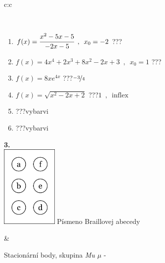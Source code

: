 \documentclass[10pt]{report}
\begin{document}
\begin{tabular}{c:c}
\begin{minipage}[c][104.5mm][t]{0.5\linewidth}
\begin{center}
\begin{minipage}{0.95\linewidth}
\begin{center}
\end{center}
\end{minipage}
\\[1mm]
\begin{minipage}{0.79\linewidth}
\begin{center}
\begin{varwidth}{\linewidth}
\begin{enumerate}
\normalsize
\item $f(x)=\cfrac{x^2-5x-5}{-2x-5}\enspace , \enspace x_0=-2$\quad \dotfill\; ???\;\dotfill \quad {}
\item $f(x)=4x^4+2x^3+8x^2-2x+3\enspace , \enspace x_0=1$\quad \dotfill\; ???\;\dotfill \quad {}
\item $f(x)=8xe^{4x}$\quad \dotfill\; ???\;\dotfill \quad $\nicefrac{-3}{4}$
\item $f(x)=\sqrt{x^2-2x+2}$\quad \dotfill\; ???\;\dotfill \quad $1\enspace , \enspace\mathrm{inflex}$
\item \quad \dotfill\; ???\;\dotfill \quad vybarvi
\item \quad \dotfill\; ???\;\dotfill \quad vybarvi
\end{enumerate}
\end{varwidth}
\end{center}
\end{minipage}
\begin{minipage}{0.20\linewidth}
\begin{center}
{\Huge\bfseries 3.} \\[2mm]
\includegraphics[height=40mm]{../images/braille.png}
{\small Písmeno Braillovej abecedy}
\end{center}
\end{minipage}
\end{center}
\end{minipage}
&
\begin{minipage}[c][104.5mm][t]{0.5\linewidth}
\begin{center}
\vspace{7mm}
{\huge Stacionární body, skupina \textit{Mu $\mu$} -}\\[5mm]

\end{center}
\end{minipage}
\end{tabular}
\end{document}
